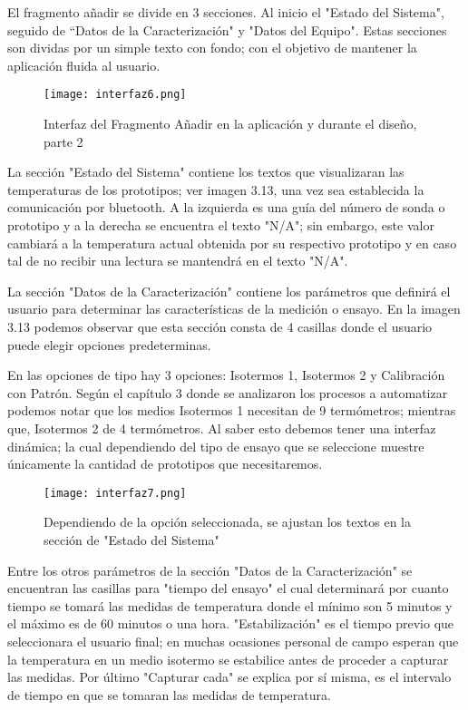 \par \noindent
El fragmento añadir se divide en 3 secciones. Al inicio el "Estado del Sistema", seguido de “Datos de la Caracterización" y "Datos del Equipo". Estas secciones son dividas por un simple texto con fondo; con el objetivo de mantener la aplicación fluida al usuario.

\begin{figure}[H]
	\centering
	\texttt{[image: interfaz6.png]}
	\caption{Interfaz del Fragmento Añadir en la aplicación y durante el diseño, parte 2}
\end{figure}

\par \noindent
La sección "Estado del Sistema" contiene los textos que visualizaran las temperaturas de los prototipos; ver imagen 3.13, una vez sea establecida la comunicación por bluetooth. A la izquierda es una guía del número de sonda o prototipo y a la derecha se encuentra el texto "N/A"; sin embargo, este valor cambiará a la temperatura actual obtenida por su respectivo prototipo y en caso tal de no recibir una lectura se mantendrá en el texto "N/A".

\par \noindent
La sección "Datos de la Caracterización" contiene los parámetros que definirá el usuario para determinar las características de la medición o ensayo. En la imagen 3.13 podemos observar que esta sección consta de 4 casillas donde el usuario puede elegir opciones predeterminas.

\par \noindent
En las opciones de tipo hay 3 opciones: Isotermos 1, Isotermos 2 y Calibración con Patrón. Según el capítulo 3 donde se analizaron los procesos a automatizar podemos notar que los medios Isotermos 1 necesitan de 9 termómetros; mientras que, Isotermos 2 de 4 termómetros. Al saber esto debemos tener una interfaz dinámica; la cual dependiendo del tipo de ensayo que se seleccione muestre únicamente la cantidad de prototipos que necesitaremos. 

\begin{figure}[H]
	\centering
	\texttt{[image: interfaz7.png]}
	\caption{Dependiendo de la opción seleccionada, se ajustan los textos en la sección de "Estado del Sistema"}
\end{figure}

\par \noindent
Entre los otros parámetros de la sección "Datos de la Caracterización" se encuentran las casillas para "tiempo del ensayo" el cual determinará por cuanto tiempo se tomará las medidas de temperatura donde el mínimo son 5 minutos y el máximo es de 60 minutos o una hora. "Estabilización" es el tiempo previo que seleccionara el usuario final; en muchas ocasiones personal de campo esperan que la temperatura en un medio isotermo se estabilice antes de proceder a capturar las medidas. Por último "Capturar cada" se explica por sí misma, es el intervalo de tiempo en que se tomaran las medidas de temperatura.


